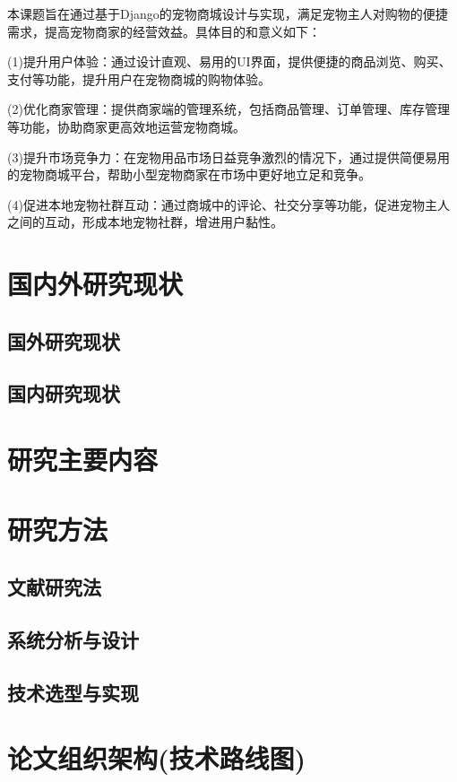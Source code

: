 本课题旨在通过基于Django的宠物商城设计与实现，满足宠物主人对购物的便捷需求，提高宠物商家的经营效益。具体目的和意义如下：\par  %
(1)提升用户体验：通过设计直观、易用的UI界面，提供便捷的商品浏览、购买、支付等功能，提升用户在宠物商城的购物体验。\par  %
(2)优化商家管理：提供商家端的管理系统，包括商品管理、订单管理、库存管理等功能，协助商家更高效地运营宠物商城。\par  %
(3)提升市场竞争力：在宠物用品市场日益竞争激烈的情况下，通过提供简便易用的宠物商城平台，帮助小型宠物商家在市场中更好地立足和竞争。\par  %
(4)促进本地宠物社群互动：通过商城中的评论、社交分享等功能，促进宠物主人之间的互动，形成本地宠物社群，增进用户黏性。\par  %
\section{国内外研究现状}
\subsection{国外研究现状}

\subsection{国内研究现状}

\section{研究主要内容}

\section{研究方法}
\subsection{文献研究法}

\subsection{系统分析与设计}

\subsection{技术选型与实现}

\section{论文组织架构(技术路线图)}

